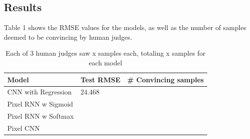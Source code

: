 \documentclass[10pt,twocolumn,letterpaper]{article}
\begin{document}
\subsection{Results}
Table 1 shows the RMSE values for the models, as well as the number of samples deemed to be convincing by human judges. 
\begin{table}[!ht]
\centering
\caption{Each of 3 human judges saw x samples each, totaling x samples for each model}
\begin{tabular}{lll}
\hline
Model               & Test RMSE & \# Convincing samples \\ \hline
CNN with Regression & 24.468    &                       \\
Pixel RNN w Sigmoid &           &                       \\
Pixel RNN w Softmax &           &                       \\
Pixel CNN           &           &                       \\ \hline
\end{tabular}
\end{table}
\end{document}
